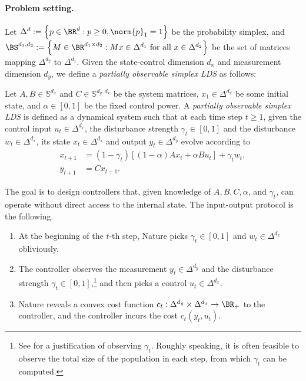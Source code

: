 \paragraph{Problem setting.} 
Let $\Delta^{d}:=\left\{p\in\BR^d: p\geq 0,\norm{p}_1=1\right\}$ be the probability simplex, and $\BS^{d_1,d_2}:=\left\{M\in\BR^{d_1 \times d_2}:Mx \in\Delta^{d_1} \textrm{ for all } x \in \Delta^{d_2}\right\}$ be the set of matrices mapping $\Delta^{d_2}$ to $\Delta^{d_1}$. Given the state-control dimension $d_x$ and measurement dimension $d_y$, we define a \emph{partially observable simplex LDS} as follows:

\begin{definition} 
\label{def:po-simplex-lds}
Let $A, B\in\mathbb{S}^{d_x}$ and $C\in\mathbb{S}^{d_y,d_x}$ be the system matrices, $x_1\in\Delta^{d_x}$ be some initial state, and $\alpha\in [0,1]$ be the fixed control power. A \emph{partially observable simplex LDS} is defined as a dynamical system such that at each time step $t\geq 1$, given the control input $u_t\in\Delta^{d_x}$, the disturbance strength $\gamma_t\in[0,1]$ and the disturbance $w_t\in\Delta^{d_x}$, its state $x_t\in\Delta^{d_x}$ and output $y_t\in\Delta^{d_y}$ evolve according to
\begin{align*}
x_{t+1}&=(1-\gamma_t)[(1-\alpha)Ax_t+\alpha Bu_t]+\gamma_tw_t, \\
y_{t+1} &= Cx_{t+1}.
\end{align*}
\end{definition}


The goal is to design controllers that, given knowledge of $A, B, C, \alpha$, and $\gamma_t$, can operate without direct access to the internal state. The input-output protocol is the following.
\begin{enumerate}
\item At the beginning of the $t$-th step, Nature picks $\gamma_t\in[0,1]$ and $w_t\in\Delta^{d_x}$ obliviously. 
\item The controller observes the measurement $y_t\in\Delta^{d_y}$ and the disturbance strength $\gamma_t\in[0,1]$,\footnote{See \citep[Appendix~B]{golowich2024online} for a justification of observing $\gamma_t$. Roughly speaking, it is often feasible to observe the total size of the population in each step, from which $\gamma_t$ can be computed.} and then picks a control $u_t\in\Delta^{d_x}$. 
\item Nature reveals a convex cost function $c_t:\Delta^{d_y}\times \Delta^{d_x}\rightarrow\BR_+$ to the controller, and the controller incurs the cost $c_t(y_t,u_t)$.
\end{enumerate}


